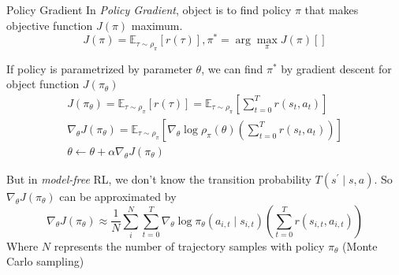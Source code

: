 \documentclass[8pt]{beamer}
\begin{document}
\begin{frame}{Policy Gradient}
    In \textit{Policy Gradient}, object is to find policy $\pi$ that makes objective function $J(\pi)$ maximum.
    \[
        J(\pi) = \mathbb{E}_{\tau \sim \rho_\pi}[ r(\tau)], \pi^\ast = \arg \max_{\pi} J(\pi) \left[  \right]
    \]

    If policy is parametrized by parameter $\theta$, we can find $\pi^\ast$ by gradient descent for object function $J(\pi_\theta)$
    \[
    \begin{gathered}
        J(\pi_\theta) = \mathbb{E}_{\tau \sim \rho_\pi}[r(\tau)] = \mathbb{E}_{\tau \sim \rho_\pi}\left[ \sum_{t=0}^T r(s_t, a_t) \right] \\ \nabla_{\theta} J(\pi_\theta) = \mathbb{E}_{\tau \sim \rho_\pi}\left[ \nabla_{\theta} \log{\rho_\pi(\theta)} \left( \sum_{t=0}^T r(s_t,a_t)\right) \right] \\
        \theta \leftarrow \theta + \alpha \nabla_{\theta} J(\pi_\theta)
    \end{gathered}
    \]

    But in \textit{model-free} RL, we don't know the transition probability $T(s^\prime \mid s, a)$. So $\nabla_\theta J(\pi_\theta)$ can be approximated by
    \[
        \nabla_\theta J(\pi_\theta) \approx \frac{1}{N}\sum_i^N \sum_{t=0}^T \nabla_\theta \log{\pi_\theta}(a_{i, t} \mid s_{i, t}) \left(\sum_{t=0}^T r(s_{i,t}, a_{i, t})\right)
    \]
    Where $N$ represents the number of trajectory samples with policy $\pi_\theta$ (Monte Carlo sampling)
\end{frame}
\end{document}
